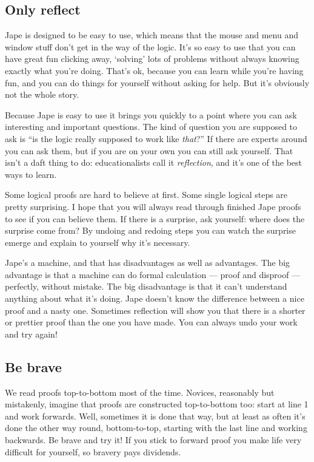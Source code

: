 \documentclass[11pt]{book}
\begin{document}
\subsection{Only reflect}

Jape is designed to be easy to use, which means that the mouse and menu and window stuff don't get in the way of the logic. It's so easy to use that you can have great fun clicking away, `solving' lots of problems without always knowing exactly what you're doing. That's ok, because you can learn while you're having fun, and you can do things for yourself without asking for help. But it's obviously not the whole story.

Because Jape is easy to use it brings you quickly to a point where you can ask interesting and important questions. The kind of question you are supposed to ask is ``is the logic really supposed to work like \emph{that}?'' If there are experts around you can ask them, but if you are on your own you can still ask yourself. That isn't a daft thing to do: educationalists call it \emph{reflection}, and it's one of the best ways to learn.

Some logical proofs are hard to believe at first. Some single logical steps are pretty surprising. I hope that you will always read through finished Jape proofs to see if you can believe them. If there is a surprise, ask yourself: where does the surprise come from? By undoing and redoing steps you can watch the surprise emerge and explain to yourself why it's necessary.

Jape's a machine, and that has disadvantages as well as advantages. The big advantage is that a machine can do formal calculation --- proof and disproof --- perfectly, without mistake. The big disadvantage is that it can't understand anything about what it's doing. Jape doesn't know the difference between a nice proof and a nasty one. Sometimes reflection will show you that there is a shorter or prettier proof than the one you have made. You can always undo your work and try again!

\subsection{Be brave}

We read proofs top-to-bottom most of the time. Novices, reasonably but mistakenly, imagine that proofs are constructed top-to-bottom too: start at line 1 and work forwards. Well, sometimes it is done that way, but at least as often it's done the other way round, bottom-to-top, starting with the last line and working backwards. Be brave and try it! If you stick to forward proof you make life very difficult for yourself, so bravery pays dividends.
\end{document}
